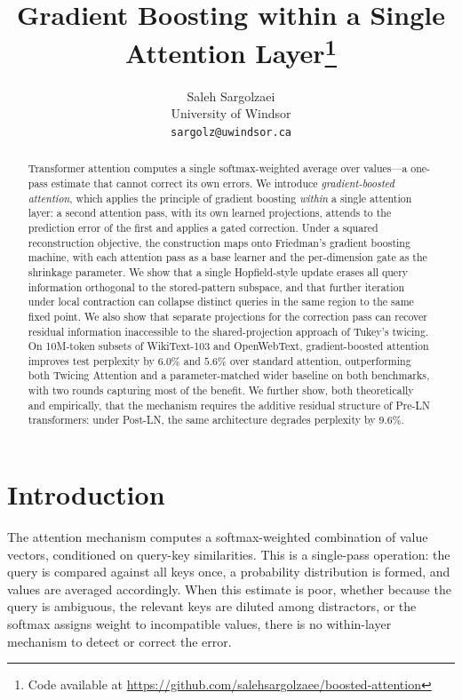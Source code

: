 \documentclass{article}
\title{Gradient Boosting within a Single Attention Layer\thanks{Code available at \url{https://github.com/salehsargolzaee/boosted-attention}}}
\author{
  Saleh Sargolzaei \\
  University of Windsor \\
  \texttt{sargolz@uwindsor.ca}
}
\theoremstyle{definition}
\begin{document}
\maketitle

\begin{abstract}
Transformer attention computes a single softmax-weighted average over values---a one-pass estimate that cannot correct its own errors.
We introduce \emph{gradient-boosted attention}, which applies the principle of gradient boosting \emph{within} a single attention layer: a second attention pass, with its own learned projections, attends to the prediction error of the first and applies a gated correction.
Under a squared reconstruction objective, the construction maps onto Friedman's gradient boosting machine, with each attention pass as a base learner and the per-dimension gate as the shrinkage parameter.
We show that a single Hopfield-style update erases all query information orthogonal to the stored-pattern subspace, and that further iteration under local contraction can collapse distinct queries in the same region to the same fixed point.
We also show that separate projections for the correction pass can recover residual information inaccessible to the shared-projection approach of Tukey's twicing.
On 10M-token subsets of WikiText-103 and OpenWebText, gradient-boosted attention improves test perplexity by $6.0\%$ and $5.6\%$ over standard attention, outperforming both Twicing Attention and a parameter-matched wider baseline on both benchmarks, with two rounds capturing most of the benefit.
We further show, both theoretically and empirically, that the mechanism requires the additive residual structure of Pre-LN transformers: under Post-LN, the same architecture degrades perplexity by $9.6\%$.
\end{abstract}


\section{Introduction}
\label{sec:intro}

The attention mechanism \citep{vaswani2017attention} computes a softmax-weighted combination of value vectors, conditioned on query-key similarities.
This is a single-pass operation: the query is compared against all keys once, a probability distribution is formed, and values are averaged accordingly.
When this estimate is poor, whether because the query is ambiguous, the relevant keys are diluted among distractors, or the softmax assigns weight to incompatible values, there is no within-layer mechanism to detect or correct the error.
\end{document}
